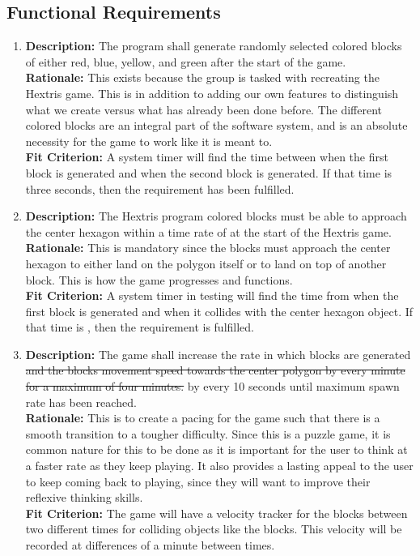 \documentclass[12pt, titlepage]{article}
\begin{document}
\subsection{Functional Requirements}
\begin{enumerate}[label=F\arabic*]
\item \textbf{Description:} The program shall generate randomly selected colored blocks of either red, blue, yellow, and green after the start of the game.\\
\textbf{Rationale:} This exists because the group is tasked with recreating the Hextris game. This is in addition to adding our own features to distinguish what we create versus what has already been done before. The different colored blocks are an integral part of the software system, and is an absolute necessity for the game to work like it is meant to. \\
\textbf{Fit Criterion:} A system timer will find the time between when the first block is generated and when the second block is generated. If that time is three seconds, then the requirement has been fulfilled. 

\item \textbf{Description:} The Hextris program colored blocks must be able to approach the center hexagon within a time rate of \textdelta \space at the start of the Hextris game.\\
\textbf{Rationale:} This is mandatory since the blocks must approach the center hexagon to either land on the polygon itself or to land on top of another block. This is how the game progresses and functions. \\
\textbf{Fit Criterion:} A system timer in testing will find the time from when the first block is generated and when it collides with the center hexagon object. If that time is \textdelta, then the requirement is fulfilled. 

\item \textbf{Description:} The game shall increase the rate in which blocks are generated \sout{and the blocks movement speed towards the center polygon by \textalpha \space every minute for a maximum of four minutes.} {\color{blue}by \textalpha \space every 10 seconds until maximum spawn rate has been reached.}\\
\textbf{Rationale:} This is to create a pacing for the game such that there is a smooth transition to a tougher difficulty. Since this is a puzzle game, it is common nature for this to be done as it is important for the user to think at a faster rate as they keep playing. It also provides a lasting appeal to the user to keep coming back to playing, since they will want to improve their reflexive thinking skills.\\
\textbf{Fit Criterion:} The game will have a velocity tracker for the blocks between two different times for colliding objects like the blocks. This velocity will be recorded at differences of a minute between times. 


\end{enumerate}
\end{document}
